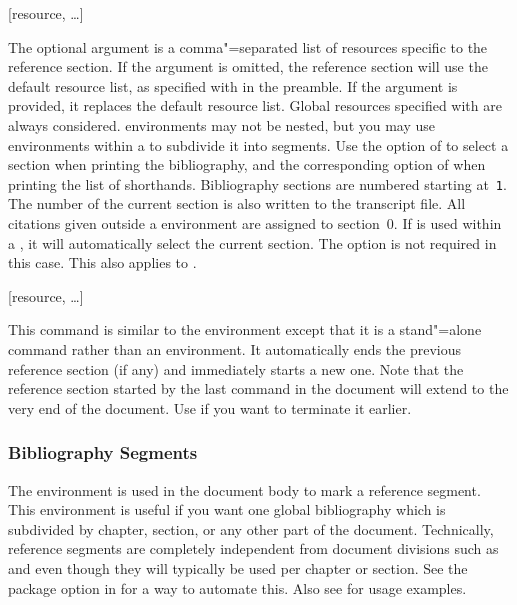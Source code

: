 \documentclass{ltxdockit}[2011/03/25]
\begin{document}
\begin{ltxsyntax}

[resource, \dots]

The optional argument is a comma"=separated list of resources specific to the reference section. If the argument is omitted, the reference section will use the default resource list, as specified with  in the preamble. If the argument is provided, it replaces the default resource list. Global resources specified with  are always considered.  environments may not be nested, but you may use  environments within a  to subdivide it into segments. Use the  option of  to select a section when printing the bibliography, and the corresponding option of  when printing the list of shorthands. Bibliography sections are numbered starting at~\texttt{1}. The number of the current section is also written to the transcript file. All citations given outside a  environment are assigned to section~0. If  is used within a , it will automatically select the current section. The  option is not required in this case. This also applies to .

[resource, \dots]

This command is similar to the  environment except that it is a stand"=alone command rather than an environment. It automatically ends the previous reference section (if any) and immediately starts a new one. Note that the reference section started by the last  command in the document will extend to the very end of the document. Use  if you want to terminate it earlier.

\end{ltxsyntax}

\subsubsection{Bibliography Segments}
\label{use:bib:seg}

The  environment is used in the document body to mark a reference segment. This environment is useful if you want one global bibliography which is subdivided by chapter, section, or any other part of the document. Technically, reference segments are completely independent from document divisions such as  and  even though they will typically be used per chapter or section. See the  package option in  for a way to automate this. Also see  for usage examples.
\end{document}
